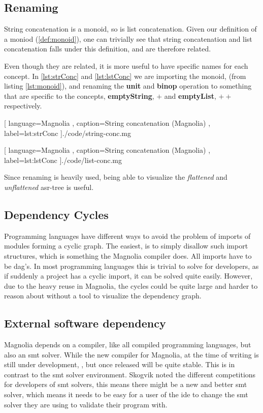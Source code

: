 \subsection{Renaming}

String concatenation is a monoid, so is list concatenation.
Given our definition of a moniod (\ref{def:monoid}), one can trivially see that
string concatenation and list concatenation falls under this definition, and are
therefore related.

Even though they are related, it is more useful to have specific names for each
concept. In \ref{lst:strConc} and \ref{lst:lstConc} we are importing the
monoid, (from listing \ref{lst:monoid}), and renaming the \textbf{unit} and
\textbf{binop} operation to something that are specific to the concepts,
\textbf{emptyString}, $+$ and \textbf{emptyList}, $++$ respectively.

\begin{center}
  
    [ language=Magnolia
    , caption={String concatenation (Magnolia)}
    , label=lst:strConc
    ]{./code/string-conc.mg}
\end{center}

\begin{center}
  
    [ language=Magnolia
    , caption={String concatenation (Magnolia)}
    , label=lst:lstConc
    ]{./code/list-conc.mg}
\end{center}

Since renaming is heavily used, being able to visualize the \textit{flattened}
and \textit{unflattened} \gls{asr}-tree is useful.

\subsection{Dependency Cycles}

Programming languages have different ways to avoid the problem of imports of
modules forming a cyclic graph. The easiest, is to simply disallow such import
structures, which is something the Magnolia compiler does. All imports have to be
\gls{dag}'s. In most programming languages this is trivial to solve for
developers, as if suddenly a project has a cyclic import, it can be solved quite
easily. However, due to the heavy reuse in Magnolia, the cycles could be quite
large and harder to reason about without a tool to visualize the dependency graph.

\subsection{External software dependency}

Magnolia depends on a compiler, like all compiled programming languages, but
also an \gls{smt} solver. While the new compiler for Magnolia, at the time of
writing is still under development, \cite{wiig}, but once released will be quite
stable. This is in contrast to the \gls{smt} solver environment. Skogvik
\cite{beateVerification} noted the different competitions for developers of
\gls{smt} solvers, this means there might be a new and better \gls{smt} solver,
which means it needs to be easy for a user of the \gls{ide} to change the
\gls{smt} solver they are using to validate their program with.
